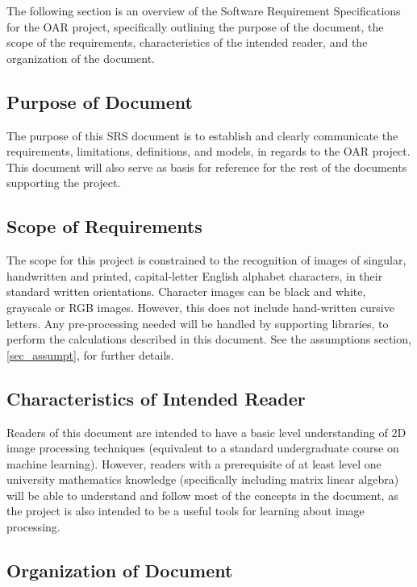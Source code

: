 \documentclass[12pt]{article}
\begin{document}
The following section is an overview of the Software Requirement Specifications for the OAR project, specifically outlining the 
purpose of the document, the scope of the requirements, characteristics of the intended reader, and the organization of the 
document.

\subsection{Purpose of Document}

The purpose of this SRS document is to establish and clearly communicate the requirements, limitations, definitions, and models, 
in regards to the OAR project. This document will also serve as basis for reference for the rest of the documents 
supporting the project. 

\subsection{Scope of Requirements} 

The scope for this project is constrained to the recognition of images of singular, handwritten and printed, capital-letter English
alphabet characters, in their standard written orientations. Character images can be black and white, grayscale or RGB images.
However, this does not include hand-written cursive letters. Any pre-processing needed will be handled by supporting libraries,
to perform the calculations described in this document.
See the assumptions section, \ref{sec_assumpt}, for further details.

\subsection{Characteristics of Intended Reader} \label{sec_IntendedReader}

Readers of this document are intended to have a basic level understanding of 2D image 
processing techniques (equivalent to a standard undergraduate course on machine learning). However, readers with
a prerequisite of at least level one university mathematics knowledge (specifically including matrix linear algebra) will
be able to understand and follow most of the concepts in the document, as the project is also intended to be a useful tools
for learning about image processing.

\subsection{Organization of Document}
\end{document}

